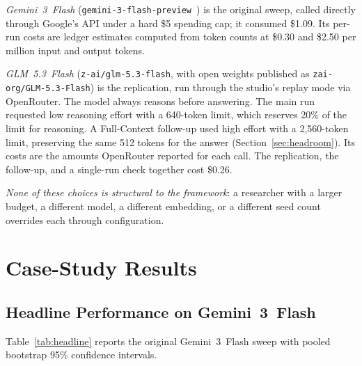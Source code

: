 \documentclass[conference,a4paper,10pt]{IEEEtran}
\begin{document}
\emph{Gemini~3~Flash} (\texttt{gemini-3-flash-preview}~\cite{gemini2024}) is the original sweep, called directly through Google's API under a hard \$5 spending cap; it consumed \$1.09.
Its per-run costs are ledger estimates computed from token counts at \$0.30 and \$2.50 per million input and output tokens.

\emph{GLM~5.3~Flash} (\texttt{z-ai/glm-5.3-flash}, with open weights published as \texttt{zai-org/GLM-5.3-Flash}) is the replication, run through the studio's replay mode via OpenRouter.
The model always reasons before answering.
The main run requested low reasoning effort with a 640-token limit, which reserves 20\% of the limit for reasoning.
A Full-Context follow-up used high effort with a 2{,}560-token limit, preserving the same 512 tokens for the answer (Section~\ref{sec:headroom}).
Its costs are the amounts OpenRouter reported for each call.
The replication, the follow-up, and a single-run check together cost \$0.26.

\emph{None of these choices is structural to the framework}: a researcher with a larger budget, a different model, a different embedding, or a different seed count overrides each through configuration.

\section{Case-Study Results}
\label{sec:results}

\subsection{Headline Performance on Gemini~3~Flash}
\label{sec:headline}

Table~\ref{tab:headline} reports the original Gemini~3~Flash sweep with pooled bootstrap 95\% confidence intervals.
\end{document}

